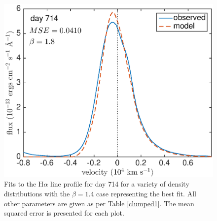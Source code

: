 \begin{figure}
\includegraphics[clip = true, scale=0.43, trim=20 0 40 0]{chapters/chapter5/images/MSE/d714_B/d714_B1_8}

\caption{Fits to the H$\alpha$ line profile for day 714 for a variety of density distributions with the $\beta=1.4$ case representing the best fit.  All other parameters are given as per Table \ref{clumped1}. The mean squared error is presented for each plot.}
\end{figure}

